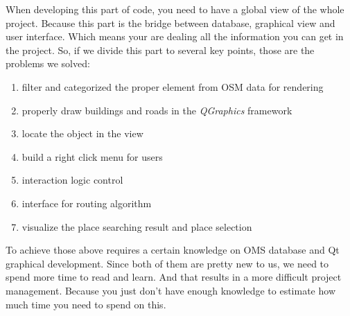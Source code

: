 \documentclass[a4paper, 12pt, english]{book}
\begin{document}
When developing this part of code, you need to have a global view of the whole project. Because this part is the bridge between database, graphical view and user interface. Which means your are dealing all the information you can get in the project. So, if we divide this part to several key points, those are the problems we solved:
\begin{enumerate}
	\item filter and categorized the proper element from OSM data for rendering
	\item properly draw buildings and roads in the {\textit{QGraphics}} framework
	\item locate the object in the view
	\item build a right click menu for users
	\item interaction logic control
	\item interface for routing algorithm
	\item visualize the place searching result and place selection
\end{enumerate}

To achieve those above requires a certain knowledge on OMS database and Qt graphical development. Since both of them are pretty new to us, we need to spend more time to read and learn. And that results in a more difficult project management. Because you just don't have enough knowledge to estimate how much time you need to spend on this.
\end{document}
